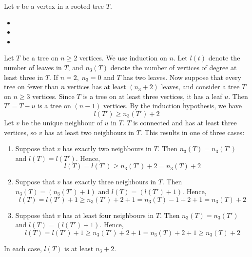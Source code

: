 
Let \(v\) be a vertex in a rooted tree \(T\).
\begin{itemize}
    \item {}
    \item {}
    \item {}
\end{itemize} 

{Let \(T\) be a tree on \(n \geq 2\) vertices. We use induction on \(n\). Let \(l(t)\) denote the number of leaves in \(T\), and \(n_3(T)\) denote the number of vertices of degree at least three in \(T\). If \(n=2, \; n_3=0\) and \(T\) has two leaves.
Now suppose that every tree on fewer than \(n\) vertices has at least \((n_3+2)\) leaves, and consider a tree \(T\) on \(n \geq 3\) vertices. Since \(T\) is a tree on at least three vertices, it has a leaf \(u\). Then \(T'=T-u\) is a tree on \((n-1)\) vertices. By the induction hypothesis, we have 
\begin{equation}l(T') \geq n_3(T') + 2\end{equation}
Let \(v\) be the unique neighbour of \(u\) in \(T\). \(T\) is connected and has at least three vertices, so \(v\) has at least two neighbours in \(T\). This results in one of three cases:
\begin{enumerate}
    \item Suppose that \(v\) has exactly two neighbours in \(T\). Then \(n_3(T)=n_3(T')\) and \(l(T)=l(T')\). Hence,
    \begin{equation}
        l(T) = l(T') \geq n_3(T') + 2 = n_3(T) + 2
    \end{equation}
    \item Suppose that \(v\) has exactly three neighbours in \(T\). Then \(n_3(T) = (n_3(T') + 1)\) and \(l(T) = (l(T') + 1)\). Hence,
    \begin{equation}
        l(T) = l(T') + 1 \geq n_3(T') + 2 + 1 = n_3(T) - 1 + 2 + 1 = n_3(T) + 2
    \end{equation}
    \item Suppose that \(v\) has at least four neighbours in \(T\). Then \(n_3(T) = n_3(T')\) and \(l(T) = (l(T') + 1)\). Hence,
    \begin{equation}
        l(T) = l(T') + 1 \geq n_3(T') + 2 + 1 = n_3(T) + 2 + 1 \geq n_3(T) + 2
    \end{equation}
\end{enumerate}
In each case, \(l(T)\) is at least \(n_3+2\).}

